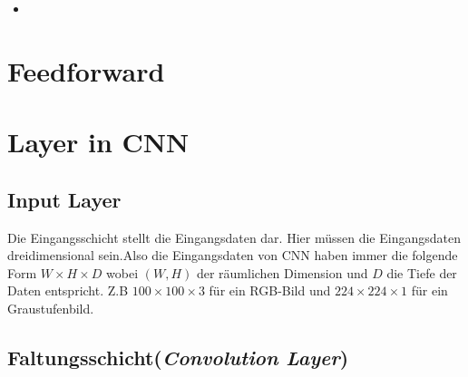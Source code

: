 \documentclass[12pt,a4paper]{scrartcl}
\numberwithin{equation}{section}
\begin{document}
\begin{itemize}
%	
%	
%	
%	
\item  
\end{itemize}





\section{Feedforward }
\section{Layer in \ac{CNN}}
\subsection{Input Layer}
Die Eingangsschicht stellt die Eingangsdaten dar. Hier müssen die Eingangsdaten dreidimensional sein.Also die Eingangsdaten von \ac{CNN}  haben immer die folgende Form $ W\times H\times D $ wobei $ (W, H) $ der räumlichen Dimension und $ D $ die Tiefe der Daten entspricht. Z.B  $ 100\times100 \times3 $ für ein RGB-Bild und $ 224\times224\times1 $ für ein Graustufenbild.


\subsection{Faltungsschicht(\textit{Convolution Layer})}
\end{document}
